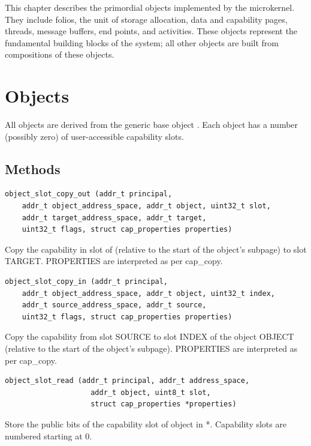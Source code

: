 This chapter describes the primordial objects implemented by the
microkernel.  They include folios, the unit of storage allocation,
data and capability pages, threads, message buffers, end points, and
activities.  These objects represent the fundamental building blocks
of the system; all other objects are built from compositions of these
objects.

\clearpage
\section{Objects}

All objects are derived from the generic base object .
Each object has a number (possibly zero) of user-accessible capability
slots.

\subsection{Methods}

\begin{lstlisting}
object_slot_copy_out (addr_t principal,
    addr_t object_address_space, addr_t object, uint32_t slot,
    addr_t target_address_space, addr_t target,
    uint32_t flags, struct cap_properties properties)
\end{lstlisting}

Copy the capability in slot  of  (relative to
the start of the object's subpage) to slot TARGET.  PROPERTIES are
interpreted as per cap\_copy.

\begin{lstlisting}
object_slot_copy_in (addr_t principal,
    addr_t object_address_space, addr_t object, uint32_t index,
    addr_t source_address_space, addr_t source,
    uint32_t flags, struct cap_properties properties)
\end{lstlisting}

Copy the capability from slot SOURCE to slot INDEX of the object
OBJECT (relative to the start of the object's subpage).  PROPERTIES
are interpreted as per cap\_copy.

\begin{lstlisting}
object_slot_read (addr_t principal, addr_t address_space,
                    addr_t object, uint8_t slot,
                    struct cap_properties *properties)
\end{lstlisting}

Store the public bits of the capability slot  of object
 in *.  Capability slots are numbered
starting at 0.

